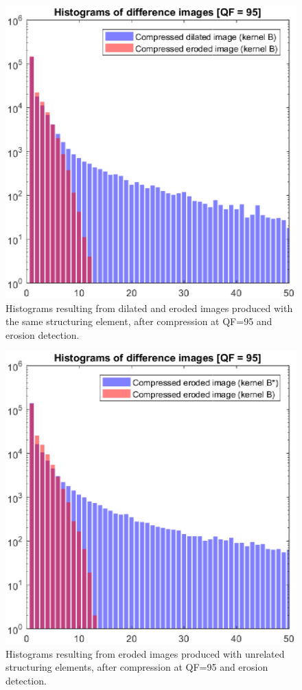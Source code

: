 \documentclass[review]{elsarticle}
\begin{document}
\begin{figure}[!ht]
	\centering
	\includegraphics[scale=0.55]{hist_dil_ero_same.eps}
	\caption{Histograms resulting from dilated and eroded images produced with the same structuring element, after compression at QF=95 and erosion detection.}
	\label{fig:hist_dil_ero_same}
\end{figure}

\begin{figure}[!ht]
	\centering
	\includegraphics[scale=0.55]{hist_ero_ero_diff.eps}
	\caption{Histograms resulting from eroded images produced with unrelated structuring elements, after compression at QF=95 and erosion detection.}
	\label{fig:hist_ero_ero_diff}
\end{figure}
\end{document}
